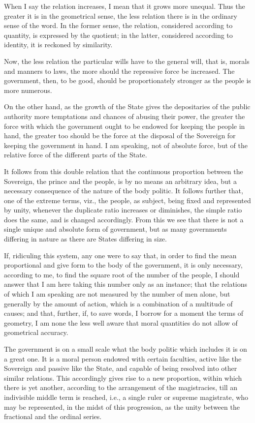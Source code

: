 \documentclass[12pt]{report}
\begin{document}
When I say the relation increases, I mean that it grows more unequal. Thus the greater it is in the geometrical sense, the less relation there is in the ordinary sense of the word. In the former sense, the relation, considered according to quantity, is expressed by the quotient; in the latter, considered according to identity, it is reckoned by similarity.

Now, the less relation the particular wills have to the general will, that is, morals and manners to laws, the more should the repressive force be increased. The government, then, to be good, should be proportionately stronger as the people is more numerous.

On the other hand, as the growth of the State gives the depositaries of the public authority more temptations and chances of abusing their power, the greater the force with which the government ought to be endowed for keeping the people in hand, the greater too should be the force at the disposal of the Sovereign for keeping the government in hand. I am speaking, not of absolute force, but of the relative force of the different parts of the State.

It follows from this double relation that the continuous proportion between the Sovereign, the prince and the people, is by no means an arbitrary idea, but a necessary consequence of the nature of the body politic. It follows further that, one of the extreme terms, viz., the people, as subject, being fixed and represented by unity, whenever the duplicate ratio increases or diminishes, the simple ratio does the same, and is changed accordingly. From this we see that there is not a single unique and absolute form of government, but as many governments differing in nature as there are States differing in size.

If, ridiculing this system, any one were to say that, in order to find the mean proportional and give form to the body of the government, it is only necessary, according to me, to find the square root of the number of the people, I should answer that I am here taking this number only as an instance; that the relations of which I am speaking are not measured by the number of men alone, but generally by the amount of action, which is a combination of a multitude of causes; and that, further, if, to save words, I borrow for a moment the terms of geometry, I am none the less well aware that moral quantities do not allow of geometrical accuracy.

The government is on a small scale what the body politic which includes it is on a great one. It is a moral person endowed with certain faculties, active like the Sovereign and passive like the State, and capable of being resolved into other similar relations. This accordingly gives rise to a new proportion, within which there is yet another, according to the arrangement of the magistracies, till an indivisible middle term is reached, i.e., a single ruler or supreme magistrate, who may be represented, in the midst of this progression, as the unity between the fractional and the ordinal series.
\end{document}
